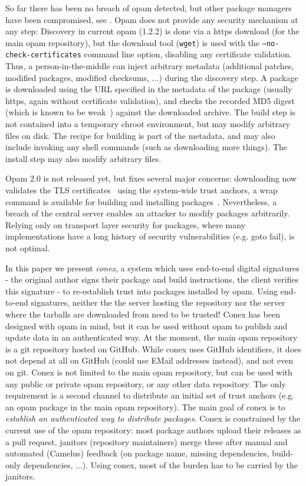 \documentclass[nocopyrightspace]{sigplanconf}
\begin{document}
So far there has been no breach of opam detected, but other package managers have been compromised, see \cite{cabal,maven,npm,rubygems}.
Opam does not provide any security mechanism at any step:
Discovery in current opam (1.2.2) is done via a https download (for the main opam repository), but the download tool (\texttt{wget}) is used with the \texttt{--no-check-certificates} command line option, disabling any certificate validation.
Thus, a person-in-the-middle can inject arbitrary metadata (additional patches, modified packages, modified checksums, ...) during the discovery step.
A package is downloaded using the URL specified in the metadata of the package (usually https, again without certificate validation), and checks the recorded MD5 digest (which is known to be weak~\cite{rfc6151}) against the downloaded archive.
The build step is not contained into a temporary chroot environment, but may modify arbitrary files on disk.
The recipe for building is part of the metadata, and may also include invoking any shell commands (such as downloading more things).
The install step may also modify arbitrary files.

Opam 2.0 is not released yet, but fixes several major concerns:
downloading now validates the TLS certificates~\cite{opampr} using the system-wide trust anchors,
a wrap command is available for building and installing packages~\cite{wrappr}.
Nevertheless, a breach of the central server enables an attacker to modify packages arbitrarily.
Relying only on transport layer security for packages, where many implementations have a long history of security vulnerabilities (e.g. goto fail), is not optimal.

In this paper we present \emph{conex}, a system which uses end-to-end digital signatures - the original author signs their package and build instructions, the client verifies this signature - to re-establish trust into packages installed by opam.
Using end-to-end signatures, neither the the server hosting the repository nor the server where the tarballs are downloaded from need to be trusted!
Conex has been designed with opam in mind, but it can be used without opam to publish and update data in an authenticated way.
At the moment, the main opam repository is a git repository hosted on GitHub.
While conex uses GitHub identifiers, it does not depend at all on GitHub (could use EMail addresses instead), and not even on git.
Conex is not limited to the main opam repository, but can be used with any public or private opam repository, or any other data repository.
The only requirement is a second channel to distribute an initial set of trust anchors (e.g. an opam package in the main opam repository).
The main goal of conex is to \emph{establish an authenticated way to distribute packages}.
Conex is constrained by the current use of the opam repository:  most package authors upload their releases as a pull request, janitors (repository maintainers) merge these after manual and automated (Camelus) feedback (on package name, missing dependencies, build-only dependencies, ...).
Using conex, most of the burden has to be carried by the janitors.
\end{document}
